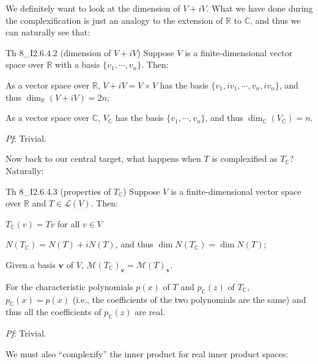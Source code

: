 \documentclass{article}
\begin{document}
We definitely want to look at the dimension of $V+iV$. What we have done during the complexification is just an analogy to the extension of $\mathbb{R}$ to $\mathbb{C}$, and thus we can naturally see that:

\begin{Th}{Th 8\_I2.6.4.2 (dimension of $V+iV$)}
    Suppose $V$ is a finite-dimensional vector space over $\mathbb{R}$ with a basis $\{v_1, \cdots, v_n\}$. Then:
    \begin{compactenum}
        \item As a vector space over $\mathbb{R}$, $V+iV = V\times V$ has the basis $\{v_1, iv_1, \cdots, v_n, iv_n\}$, and thus $\dim_{\mathbb{R}}(V+iV) = 2n$;
        \item As a vector space over $\mathbb{C}$, $V_{\mathbb{C}}$ has the basis $\{v_1, \cdots, v_n\}$, and thus $\dim_{\mathbb{C}}(V_{\mathbb{C}}) = n$.
    \end{compactenum}
    \tcblower
    \textit{Pf}: Trivial.
\end{Th}

Now back to our central target, what happens when $T$ is complexified as $T_{\mathbb{C}}$? Naturally:

\begin{Th}{Th 8\_I2.6.4.3 (properties of $T_{\mathbb{C}}$)}
    Suppose $V$ is a finite-dimensional vector space over $\mathbb{R}$ and $T\in\mathcal{L}(V)$. Then:
    \begin{compactenum}
        \item $T_\mathbb{C}(v) = Tv$ for all $v\in V$
        \item $N(T_{\mathbb{C}}) = N(T) + iN(T)$, and thus $\dim N(T_{\mathbb{C}}) = \dim N(T)$;
        \item Given a basis $\pmb{v}$ of $V$, $\mathcal{M}(T_{\mathbb{C}})_{\pmb{v}} = \mathcal{M}(T)_{\pmb{v}}$.
        \item For the characteristic polynomials $p(x)$ of $T$ and $p_{\mathbb{C}}(z)$ of $T_{\mathbb{C}}$, $p_{\mathbb{C}}(x) = p(x)$ (i.e., the coefficients of the two polynomials are the same) and thus all the coefficients of $p_{\mathbb{C}}(z)$ are real.
    \end{compactenum}
    \tcblower
    \textit{Pf}: Trivial.
\end{Th}

We must also ``complexify'' the inner product for real inner product spaces:
\end{document}
